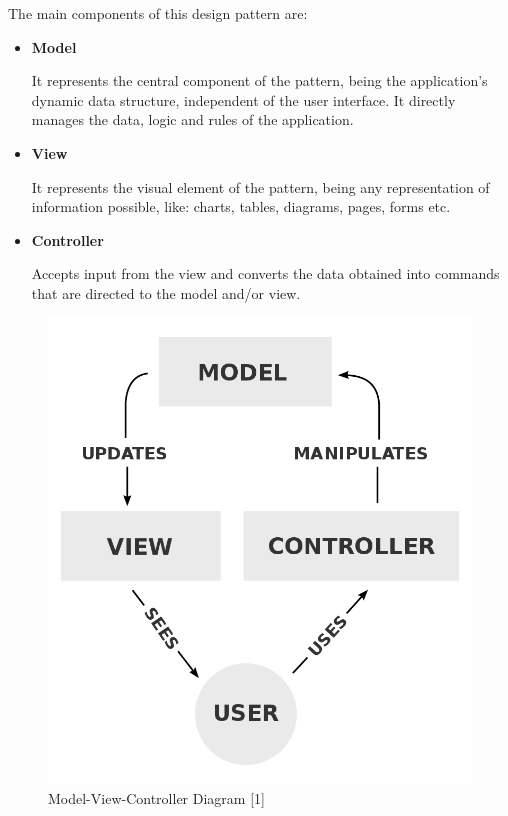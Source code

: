 \documentclass[12pt,a4paper,twoside]{report}
\begin{document}
The main components of this design pattern are:

\begin{itemize}
\item \textbf{Model}
		
It represents the central component of the pattern, being the application's dynamic data structure, independent of the user interface. It directly manages the data, logic and rules of the application.

\item \textbf{View}

It represents the visual element of the pattern, being any representation of information possible, like: charts, tables, diagrams, pages, forms etc. 

\item \textbf{Controller}

Accepts input from the view and converts the data obtained into commands that are directed to the model and/or view.
\end{itemize}

\begin{figure}
	\centering
	\includegraphics[scale=0.2]{img/diags/MVCDiag.png}
	\caption{Model-View-Controller Diagram [1]}
\end{figure}
\end{document}
